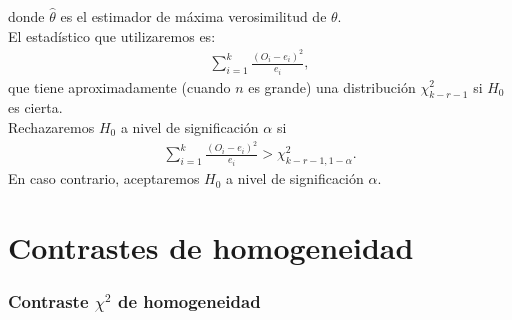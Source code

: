 donde $\widehat{\theta}$ es el estimador de máxima verosimilitud de $\theta$.
\\
\newline
El estadístico que utilizaremos es:
\begin{align*}
    \sum_{i=1}^{k} \frac{(O_i - e_i)^2}{e_i},
\end{align*}
que tiene aproximadamente (cuando $n$ es grande) una distribución $\chi^2_{k-r-1}$ si $H_0$ es cierta.
\\
\newline
Rechazaremos $H_0$ a nivel de significación $\alpha$ si
\begin{align*}
    \sum_{i=1}^{k} \frac{(O_i - e_i)^2}{e_i} > \chi^2_{k-r-1, 1 - \alpha}.
\end{align*}
En caso contrario, aceptaremos $H_0$ a nivel de significación $\alpha$.

\section{Contrastes de homogeneidad}

\subsubsection{Contraste $\chi^2$ de homogeneidad}

